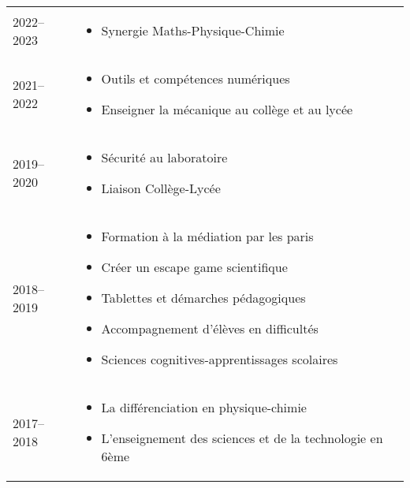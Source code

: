 \documentclass{cv-style-cec}
\begin{document}
\begin{tabular}{lp{12cm}}
    2022--2023 & %
        \vspace{-8pt}
        \begin{itemize}
            \item Synergie Maths-Physique-Chimie
        \end{itemize} \vspace{-9pt} \\
    2021--2022 & %
        \vspace{-8pt}
        \begin{itemize}
            \item Outils et compétences numériques
            \item Enseigner la mécanique au collège et au lycée
        \end{itemize} \vspace{-9pt} \\
    2019--2020 & %
        \vspace{-8pt}
        \begin{itemize}
            \item Sécurité au laboratoire
            \item Liaison Collège-Lycée
        \end{itemize} \vspace{-9pt} \\
    2018--2019 & %
        \vspace{-8pt}
        \begin{itemize}
            \item Formation à la médiation par les paris
            \item Créer un escape game scientifique
            \item Tablettes et démarches pédagogiques
            \item Accompagnement d'élèves en difficultés
            \item Sciences cognitives-apprentissages scolaires
        \end{itemize}\vspace{-9pt}\\
    2017--2018 & %
        \vspace{-8pt}
        \begin{itemize}
            \item La différenciation en physique-chimie
            \item L'enseignement des sciences et de la technologie en 6ème

\end{itemize}
\end{tabular}
\end{document}
